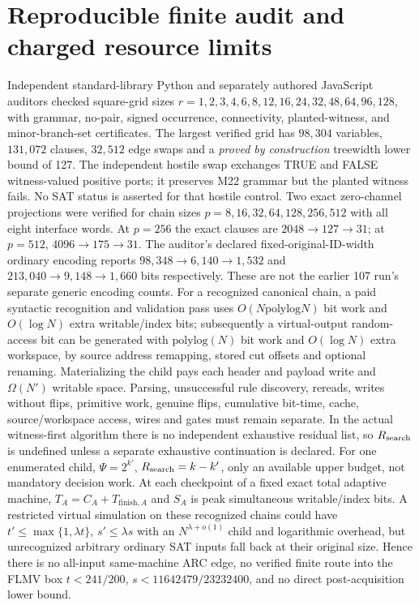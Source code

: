 \documentclass[11pt]{article}
\begin{document}
\section{Reproducible finite audit and charged resource limits}
Independent standard-library Python and separately authored JavaScript auditors checked square-grid sizes $r=1,2,3,4,6,8,12,16,24,32,48,64,96,128$, with grammar, no-pair, signed occurrence, connectivity, planted-witness, and minor-branch-set certificates. The largest verified grid has $98{,}304$ variables, $131{,}072$ clauses, $32{,}512$ edge swaps and a \emph{proved by construction} treewidth lower bound of 127. The independent hostile swap exchanges TRUE and FALSE witness-valued positive ports; it preserves M22 grammar but the planted witness fails. No SAT status is asserted for that hostile control.
Two exact zero-channel projections were verified for chain sizes $p=8,16,32,64,128,256,512$ with all eight interface words. At $p=256$ the exact clauses are $2048\to127\to31$; at $p=512$, $4096\to175\to31$. The auditor's declared fixed-original-ID-width ordinary encoding reports $98{,}348\to6{,}140\to1{,}532$ and $213{,}040\to9{,}148\to1{,}660$ bits respectively. These are not the earlier 107 run's separate generic encoding counts.
For a recognized canonical chain, a paid syntactic recognition and validation pass uses $O(N\mathrm{polylog}N)$ bit work and $O(\log N)$ extra writable/index bits; subsequently a virtual-output random-access bit can be generated with $\mathrm{polylog}(N)$ bit work and $O(\log N)$ extra workspace, by source address remapping, stored cut offsets and optional renaming. Materializing the child pays each header and payload write and $\Omega(N')$ writable space. Parsing, unsuccessful rule discovery, rereads, writes without flips, primitive work, genuine flips, cumulative bit-time, cache, source/workspace access, wires and gates must remain separate. In the actual witness-first algorithm there is no independent exhaustive residual list, so $R_{\rm search}$ is undefined unless a separate exhaustive continuation is declared. For one enumerated child, $\Psi=2^{k'}$, $R_{\rm search}=k-k'$, only an available upper budget, not mandatory decision work. At each checkpoint of a fixed exact total adaptive machine, $T_A=C_A+T_{\mathrm{finish},A}$ and $S_A$ is peak simultaneous writable/index bits.
A restricted virtual simulation on these recognized chains could have $t'\le\max\{1,\lambda t\}$, $s'\le\lambda s$ with an $N^{\lambda+o(1)}$ child and logarithmic overhead, but unrecognized arbitrary ordinary SAT inputs fall back at their original size. Hence there is no all-input same-machine ARC edge, no verified finite route into the FLMV box $t<241/200$, $s<11642479/23232400$, and no direct post-acquisition lower bound.
\end{document}
